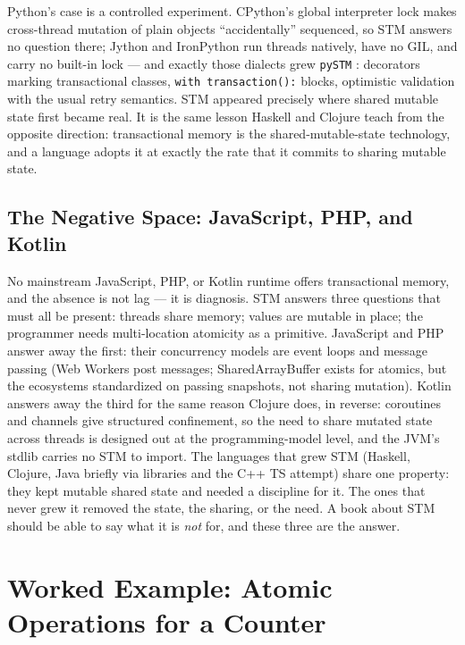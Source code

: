 Python's case is a controlled experiment. CPython's global interpreter lock
makes cross-thread mutation of plain objects ``accidentally'' sequenced, so
STM answers no question there; Jython and IronPython run threads natively,
have no GIL, and carry no built-in lock --- and exactly those dialects grew
\texttt{pySTM} \cite{pystm}: decorators marking transactional classes,
\texttt{with transaction():} blocks, optimistic validation with the usual
retry semantics. STM appeared precisely where shared mutable state first
became real. It is the same lesson Haskell and Clojure teach from the
opposite direction: transactional memory is the shared-mutable-state
technology, and a language adopts it at exactly the rate that it commits to
sharing mutable state.

\subsection{The Negative Space: JavaScript, PHP, and Kotlin}

No mainstream JavaScript, PHP, or Kotlin runtime offers transactional memory,
and the absence is not lag --- it is diagnosis. STM answers three questions
that must all be present: threads share memory; values are mutable in place;
the programmer needs multi-location atomicity as a primitive. JavaScript and
PHP answer away the first: their concurrency models are event loops and
message passing (Web Workers post messages; SharedArrayBuffer exists for
atomics, but the ecosystems standardized on passing snapshots, not sharing
mutation). Kotlin answers away the third for the same reason Clojure does,
in reverse: coroutines and channels give structured confinement, so the
need to share mutated state across threads is designed out at the
programming-model level, and the JVM's stdlib carries no STM to import.
The languages that grew STM (Haskell, Clojure, Java briefly via libraries
and the C++ TS attempt) share one property: they kept mutable shared state
and needed a discipline for it. The ones that never grew it removed the
state, the sharing, or the need. A book about STM should be able to say what
it is \emph{not} for, and these three are the answer.

\section{Worked Example: Atomic Operations for a Counter}
\label{sec:atomics-example}

